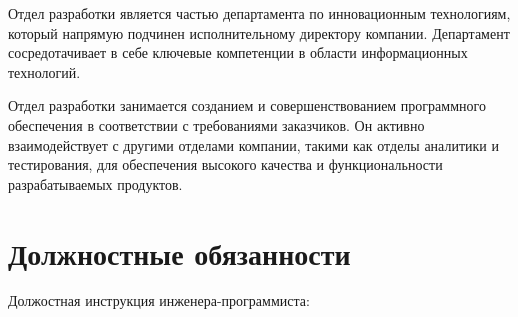 \documentclass[12pt,a4paper,draft]{report}
\begin{document}
Отдел разработки является частью департамента по инновационным технологиям, который напрямую подчинен исполнительному директору компании.
Департамент сосредотачивает в себе ключевые компетенции в области информационных технологий.

Отдел разработки занимается созданием и совершенствованием программного обеспечения в соответствии с требованиями заказчиков.
Он активно взаимодействует с другими отделами компании, такими как отделы аналитики и тестирования, для обеспечения высокого качества и функциональности разрабатываемых продуктов.

\chapter{Должностные обязанности}

Должостная инструкция инженера-программиста:
\end{document}
